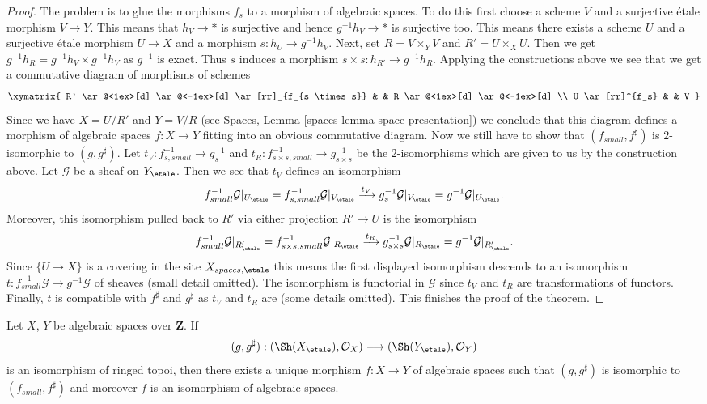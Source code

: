 \begin{proof}
\medskip\noindent
The problem is to glue the morphisms $f_s$ to a morphism of algebraic
spaces. To do this first choose a scheme $V$ and a surjective \'etale
morphism $V \to Y$. This means that $h_V \to *$ is surjective and hence
$g^{-1}h_V \to *$ is surjective too. This means there exists a scheme $U$
and a surjective \'etale morphism $U \to X$ and a morphism
$s : h_U \to g^{-1}h_V$. Next, set $R = V \times_Y V$ and
$R' = U \times_X U$. Then we get
$g^{-1}h_R = g^{-1}h_V \times g^{-1}h_V$ as $g^{-1}$ is exact.
Thus $s$ induces a morphism $s \times s : h_{R'} \to g^{-1}h_R$.
Applying the constructions above we see that we get a
commutative diagram of morphisms of schemes
$$
\xymatrix{
R' \ar@<1ex>[d] \ar@<-1ex>[d] \ar[rr]_{f_{s \times s}} & &
R \ar@<1ex>[d] \ar@<-1ex>[d] \\
U \ar[rr]^{f_s} & &
V
}
$$
Since we have $X = U/R'$ and $Y = V/R$ (see
Spaces, Lemma \ref{spaces-lemma-space-presentation})
we conclude that this diagram
defines a morphism of algebraic spaces $f : X \to Y$ fitting
into an obvious commutative diagram.
Now we still have to show that $(f_{small}, f^\sharp)$ is
$2$-isomorphic to $(g, g^\sharp)$.
Let $t_V : f_{s, small}^{-1} \to g_s^{-1}$ and
$t_R : f_{s \times s, small}^{-1} \to g_{s \times s}^{-1}$ be
the $2$-isomorphisms which are given to us by the construction above.
Let $\mathcal{G}$ be a sheaf on $Y_\etale$. Then we see that
$t_V$ defines an isomorphism
$$
f_{small}^{-1}\mathcal{G}|_{U_\etale}
=
f_{s, small}^{-1}\mathcal{G}|_{V_\etale}
\xrightarrow{t_V}
g_s^{-1}\mathcal{G}|_{V_\etale}
=
g^{-1}\mathcal{G}|_{U_\etale}.
$$
Moreover, this isomorphism pulled back to $R'$ via either projection
$R' \to U$ is the isomorphism
$$
f_{small}^{-1}\mathcal{G}|_{R'_\etale}
=
f_{s \times s, small}^{-1}\mathcal{G}|_{R_\etale}
\xrightarrow{t_R}
g_{s \times s}^{-1}\mathcal{G}|_{R_\etale}
=
g^{-1}\mathcal{G}|_{R'_\etale}.
$$
Since $\{U \to X\}$ is a covering in the site $X_{spaces, \etale}$
this means the first displayed isomorphism descends to an isomorphism
$t : f_{small}^{-1}\mathcal{G} \to g^{-1}\mathcal{G}$
of sheaves (small detail omitted). The isomorphism is functorial
in $\mathcal{G}$ since $t_V$ and $t_R$ are transformations of functors.
Finally, $t$ is compatible with $f^\sharp$ and $g^\sharp$ as
$t_V$ and $t_R$ are (some details omitted).
This finishes the proof of the theorem.
\end{proof}

\begin{lemma}
\label{lemma-isomorphism-ringed-topoi}
Let $X$, $Y$ be algebraic spaces over $\mathbf{Z}$. If
$$
(g, g^\sharp) :
(\Sh(X_\etale), \mathcal{O}_X)
\longrightarrow
(\Sh(Y_\etale), \mathcal{O}_Y)
$$
is an isomorphism of ringed topoi, then there exists a unique
morphism $f : X \to Y$ of algebraic spaces such that
$(g, g^\sharp)$ is isomorphic to $(f_{small}, f^\sharp)$
and moreover $f$ is an isomorphism of algebraic spaces.
\end{lemma}

